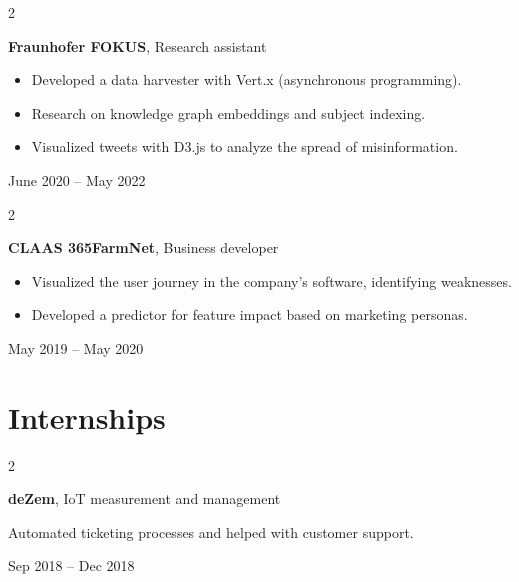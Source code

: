 \documentclass[10pt, letterpaper]{article}
\newenvironment{highlights}{
    \begin{itemize}[
        topsep=0.10 cm,
        parsep=0.10 cm,
        partopsep=0pt,
        itemsep=0pt,
        leftmargin=0.4 cm + 10pt
    ]
}{
    \end{itemize}
} %
\newenvironment{twocolentry}[2][]{
    \onecolentry
    \def\secondColumn{#2}
    \setcolumnwidth{\fill, 4.5 cm}
    \begin{paracol}{2}
}{
    \switchcolumn \raggedleft \secondColumn
    \end{paracol}
    \endonecolentry
} %
\begin{document}
        \begin{twocolentry}{
            June 2020 – May 2022
        }
            \textbf{Fraunhofer FOKUS}, Research assistant
            \begin{highlights}
                \item Developed a data harvester with Vert.x (asynchronous programming).
                \item Research on knowledge graph embeddings and subject indexing.
                \item Visualized tweets with D3.js to analyze the spread of misinformation.
            \end{highlights}
        \end{twocolentry}

        \vspace{0.1 cm}

        \begin{twocolentry}{
            May 2019 – May 2020
        }
            \textbf{CLAAS 365FarmNet}, Business developer
            \begin{highlights}
                \item Visualized the user journey in the company's software, identifying weaknesses.
                \item Developed a predictor for feature impact based on marketing personas.
            \end{highlights}
        \end{twocolentry}
    
    \section{Internships}

        \begin{samepage}
            \begin{twocolentry}{
                Sep 2018 – Dec 2018
            }
                \textbf{deZem}, IoT measurement and management
                
                \vspace{0.05 cm}
                
                Automated ticketing processes and helped with customer support.

            \end{twocolentry}
        \end{samepage}
\end{document}
